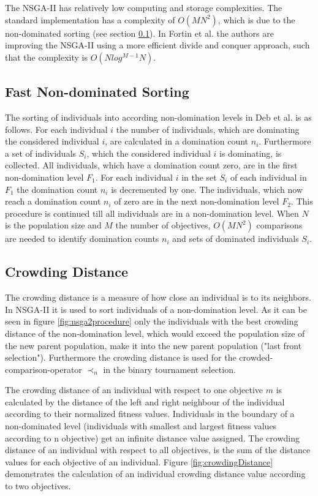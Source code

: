     The NSGA-II has relatively low computing and storage complexities. The standard implementation has a complexity of $O(MN^2)$, which is due to the non-dominated sorting\cite{Deb:2002} (see section \ref{sec:sorting}). In Fortin et al.\cite{Fortin:2013:GIR:2463372.2463454} the authors are improving the NSGA-II using a more efficient divide and conquer approach, such that the complexity is $O(N log^{M{-}1}N)$.
    
    \subsection{Fast Non-dominated Sorting}
    \label{sec:sorting}
    The sorting of individuals into according non-domination levels in Deb et al.\cite{Deb:2002} is as follows. For each individual $i$ the number of individuals, which are dominating the considered individual $i$, are calculated in a domination count $n_i$. Furthermore a set of individuals $S_i$, which the considered individual $i$ is dominating, is collected. All individuals, which have a domination count zero, are in the first non-domination level $F_1$. For each individual $i$ in the set $S_i$ of each individual in $F_1$ the domination count $n_i$ is decremented by one. The individuals, which now reach a domination count $n_i$ of zero are in the next non-domination level $F_2$. This procedure is continued till all individuals are in a non-domination level. When $N$ is the population size and $M$ the number of objectives, $O(MN^2)$ comparisons are needed to identify domination counts $n_i$ and sets of dominated individuals $S_i$.
    
    \subsection{Crowding Distance}
    \label{sec:crowdingDistance}
    The crowding distance is a measure of how close an individual is to its neighbors. In NSGA-II it is used to sort individuals of a non-domination level. As it can be seen in figure \ref{fig:nsga2procedure} only the individuals with the best crowding distance of the non-domination level, which would exceed the population size of the new parent population, make it into the new parent population ("last front selection"\cite{Fortin:2013}). Furthermore the crowding distance is used for the crowded-comparison-operator $\prec_n$ in the binary tournament selection.
    
    The crowding distance of an individual with respect to one objective $m$ is calculated by the distance of the left and right neighbour of the individual according to their normalized fitness values. Individuals in the boundary of a non-dominated level (individuals with smallest and largest fitness values according to n objective) get an infinite distance value assigned. The crowding distance of an individual with respect to all objectives, is the sum of the distance values for each objective of an individual. Figure \ref{fig:crowdingDistance} demonstrates the calculation of an individual crowding distance value according to two objectives.
    
